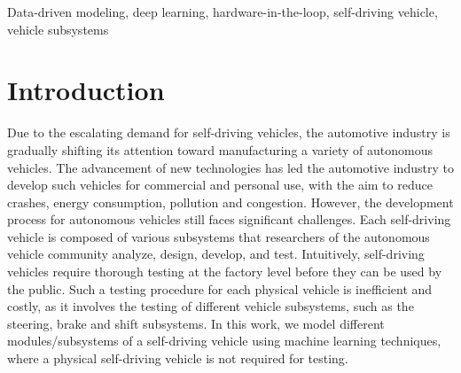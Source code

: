 \documentclass[conference]{IEEEtran}
\begin{document}
\begin{IEEEkeywords}
Data-driven modeling, deep learning, hardware-in-the-loop, self-driving vehicle, vehicle subsystems
\end{IEEEkeywords}

\section{Introduction}
\label{sec:introduction}


Due to the escalating demand for self-driving vehicles, the automotive industry is gradually shifting its attention toward manufacturing a variety of autonomous vehicles. The advancement of new technologies has led the automotive industry to develop such vehicles for commercial and personal use, with the aim to reduce crashes, energy consumption, pollution and congestion. However, the development process for autonomous vehicles still faces significant challenges. Each self-driving vehicle is composed of various subsystems that researchers of the autonomous vehicle community analyze, design, develop, and test.  Intuitively, self-driving vehicles require thorough testing at the factory level before they can be used by the public. Such a testing procedure for each physical vehicle is inefficient and costly, as it involves the testing of different vehicle subsystems, such as the steering, brake and shift subsystems. In this work, we model different modules/subsystems of a self-driving vehicle using machine learning techniques, where a physical self-driving vehicle is not required for testing.
\end{document}
